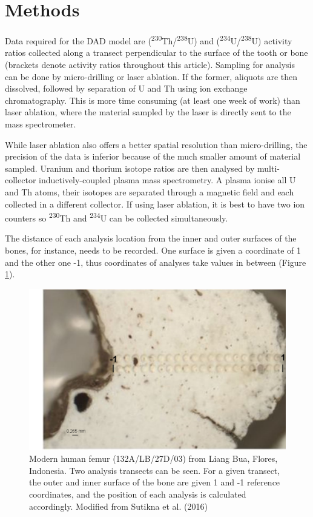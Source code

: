 \documentclass[]{elsarticle} %
\begin{document}
\hypertarget{methods}{%
\section{Methods}\label{methods}}

Data required for the DAD model are (\textsuperscript{230}Th/\textsuperscript{238}U) and (\textsuperscript{234}U/\textsuperscript{238}U) activity ratios collected along a transect perpendicular to the surface of the tooth or bone (brackets denote activity ratios throughout this article). Sampling for analysis can be done by micro-drilling or laser ablation. If the former, aliquots are then dissolved, followed by separation of U and Th using ion exchange chromatography. This is more time consuming (at least one week of work) than laser ablation, where the material sampled by the laser is directly sent to the mass spectrometer.

While laser ablation also offers a better spatial resolution than micro-drilling, the precision of the data is inferior because of the much smaller amount of material sampled. Uranium and thorium isotope ratios are then analysed by multi-collector inductively-coupled plasma mass spectrometry. A plasma ionise all U and Th atoms, their isotopes are separated through a magnetic field and each collected in a different collector. If using laser ablation, it is best to have two ion counters so \textsuperscript{230}Th and \textsuperscript{234}U can be collected simultaneously.

The distance of each analysis location from the inner and outer surfaces of the bones, for instance, needs to be recorded. One surface is given a coordinate of 1 and the other one -1, thus coordinates of analyses take values in between (Figure \ref{fig:femurpic}).



\begin{figure}
\includegraphics[width=0.95\linewidth]{figures/bone} \caption{Modern human femur (132A/LB/27D/03) from Liang Bua, Flores, Indonesia. Two analysis transects can be seen. For a given transect, the outer and inner surface of the bone are given 1 and -1 reference coordinates, and the position of each analysis is calculated accordingly. Modified from Sutikna et al. (2016)}\label{fig:femurpic}
\end{figure}
\end{document}
